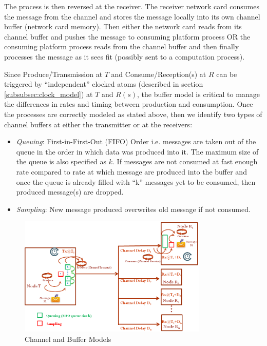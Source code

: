 The process is then reversed at the receiver. The receiver network card consumes the message from the channel and stores the message locally into its own channel buffer (network card memory). Then either the network card reads from its channel buffer and pushes the message to consuming platform process OR the consuming platform process reads from the channel buffer and then finally processes the message as it sees fit (possibly sent to a computation process).

Since Produce/Transmission at $T$ and Consume/Reception(s) at $R$ can be
triggered by ``independent'' clocked atoms (described in section
\ref{subsubsec:clock_model}) at $T$ and $R(s)$, the buffer model is critical
to manage the differences in rates and timing between production and
consumption. Once the processes are correctly modeled as stated above, then we
identify two types of channel buffers at either the transmitter or at the
receivers:

\begin{itemize}
\item \emph{Queuing}: First-in-First-Out (FIFO) Order i.e. messages are taken out of the queue in the order in which data was produced into it.  The maximum size of the queue is also specified as $k$. If messages are not consumed at fast enough rate compared to rate at which message are produced into the buffer and once the queue is already filled with ``k'' messages yet to be consumed, then produced message(s) are dropped. 

\item \emph{Sampling}: New message produced overwrites old message if not consumed.

\end{itemize}


\begin{figure}
\begin{center}
\includegraphics[width=0.8\textwidth]{figures/channel_buffer.png}
\caption{Channel and Buffer Models}
\label{fig:channel_buffer}
\end{center}
\end{figure}

